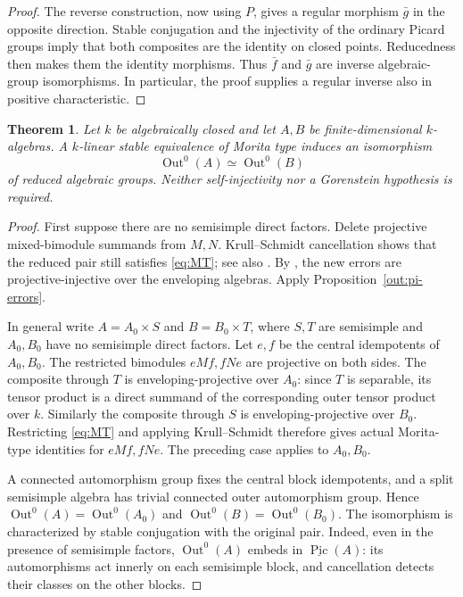 \documentclass[12pt,a4paper,english,reqno]{amsart}
\numberwithin{equation}{section}
\theoremstyle{plain}
\newtheorem{theorem}{Theorem}[section]
\theoremstyle{definition}
\begin{document}
\begin{proof}
The reverse construction, now using $P$, gives a regular
morphism $\bar g$ in the opposite direction. Stable conjugation
and the injectivity of the ordinary Picard groups imply that
both composites are the identity on closed points. Reducedness
then makes them the identity morphisms. Thus $\bar f$ and
$\bar g$ are inverse algebraic-group isomorphisms. In particular,
the proof supplies a regular inverse also in positive
characteristic.
\end{proof}

\begin{theorem}\label{out:general-semt}
Let $k$ be algebraically closed and let $A,B$ be finite-dimensional
$k$-algebras. A $k$-linear stable equivalence of Morita type
induces an isomorphism
\[
 \operatorname{Out}^0(A)\simeq\operatorname{Out}^0(B)
\]
of reduced algebraic groups. Neither self-injectivity nor a
Gorenstein hypothesis is required.
\end{theorem}

\begin{proof}
First suppose there are no semisimple direct factors. Delete
projective mixed-bimodule summands from $M,N$. Krull--Schmidt
cancellation shows that the reduced pair still satisfies
\eqref{eq:MT}; see also \cite[proof of Theorem~1.2]{CPX2012}.
By \cite[Lemma~4.1(3)]{CPX2012}, the new errors are
projective-injective over the enveloping algebras. Apply
Proposition~\ref{out:pi-errors}.

In general write $A=A_0\times S$ and $B=B_0\times T$, where
$S,T$ are semisimple and $A_0,B_0$ have no semisimple direct
factors. Let $e,f$ be the central idempotents of $A_0,B_0$.
The restricted bimodules $eMf,fNe$ are projective on both sides.
The composite through $T$ is enveloping-projective over $A_0$:
since $T$ is separable, its tensor product is a direct summand
of the corresponding outer tensor product over $k$. Similarly
the composite through $S$ is enveloping-projective over $B_0$.
Restricting \eqref{eq:MT} and applying Krull--Schmidt therefore
gives actual Morita-type identities for $eMf,fNe$. The preceding
case applies to $A_0,B_0$.

A connected automorphism group fixes the central block
idempotents, and a split semisimple algebra has trivial connected
outer automorphism group. Hence
$\operatorname{Out}^0(A)=\operatorname{Out}^0(A_0)$ and
$\operatorname{Out}^0(B)=\operatorname{Out}^0(B_0)$.
The isomorphism is characterized by stable conjugation with the
original pair. Indeed, even in the presence of semisimple factors,
$\operatorname{Out}^0(A)$ embeds in
$\underline{\operatorname{Pic}}(A)$: its automorphisms act
innerly on each semisimple block, and cancellation detects
their classes on the other blocks.
\end{proof}
\end{document}
